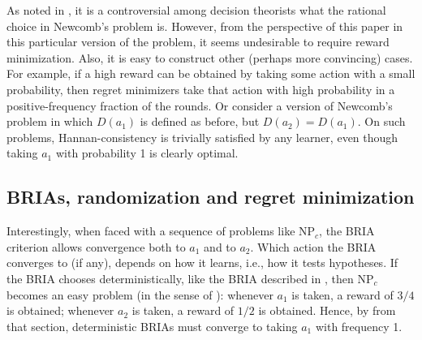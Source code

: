 \documentclass[submission,copyright,creativecommons]{eptcs}
\begin{document}
As noted in , it is a controversial among decision theorists what the rational choice in Newcomb's problem is. However, from the perspective of this paper in this particular version of the problem, it seems undesirable to require reward minimization. Also, it is easy to construct other (perhaps more convincing) cases. For example, if a high reward can be obtained by taking some action with a small probability, then regret minimizers take that action with high probability in a positive-frequency fraction of the rounds. Or consider a version of Newcomb's problem in which $D(a_1)$ is defined as before, but $D(a_2)=D(a_1)$. On such problems, Hannan-consistency is trivially satisfied by any learner, even though taking $a_1$ with probability 1 is clearly optimal.%
%
%


\begin{extendedonlyblock}

\subsection{BRIAs, randomization and regret minimization}
\label{sec:BRIA-randomization-regret}

Interestingly, when faced with a sequence of problems like $\mathrm{NP}_c$, the BRIA criterion allows convergence both to $a_1$ and to $a_2$. Which action the BRIA converges to (if any), depends on how it learns, i.e., how it tests hypotheses. If the BRIA chooses deterministically, like the BRIA described in , then $\mathrm{NP}_c$ becomes an easy problem (in the sense of ): whenever $a_1$ is taken, a reward of $3/4$ is obtained; whenever $a_2$ is taken, a reward of $1/2$ is obtained. Hence, by  from that section, deterministic BRIAs must converge to taking $a_1$ with frequency 1.


\end{extendedonlyblock}
\end{document}
